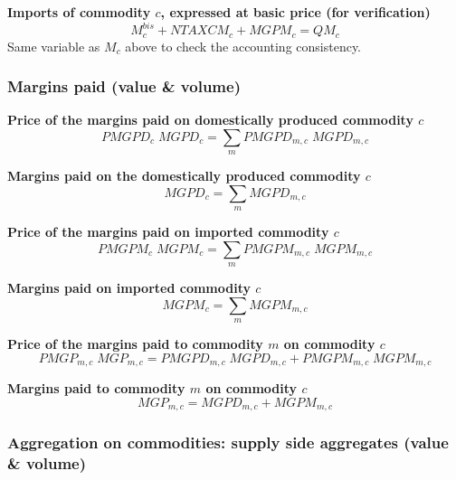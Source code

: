 \documentclass[12pt]{article}
\numberwithin{equation}{section}
\begin{document}
\noindent \textbf{Imports of commodity $c$, expressed at basic price (for verification)} 
\begin{dmath}
M^{bis}_{c} + NTAXCM_{c} + MGPM_{c} = QM_{c}
\label{SU.mdlMbis[c]}
\end{dmath}
Same variable as $M_{c}$ above to check the accounting consistency. \\



\subsubsection{Margins paid (value \& volume)}


\noindent \textbf{Price of the margins paid on domestically produced commodity $c$} 
\begin{dmath}
PMGPD_{c} \; MGPD_{c} = \sum_{m} PMGPD_{m, c} \; MGPD_{m, c}
\label{SU.mdlPMGPD[c]}
\end{dmath}

\noindent \textbf{Margins paid on the domestically produced commodity $c$} 
\begin{dmath}
MGPD_{c} = \sum_{m} MGPD_{m, c}
\label{SU.mdlMGPD[c]}
\end{dmath}

\noindent \textbf{Price of the margins paid on imported commodity $c$} 
\begin{dmath}
PMGPM_{c} \; MGPM_{c} = \sum_{m} PMGPM_{m, c} \; MGPM_{m, c}
\label{SU.mdlPMGPM[c]}
\end{dmath}

\noindent \textbf{Margins paid on imported commodity $c$} 
\begin{dmath}
MGPM_{c} = \sum_{m} MGPM_{m, c}
\label{SU.mdlMGPM[c]}
\end{dmath}

\noindent \textbf{Price of the margins paid to commodity $m$ on commodity $c$} 
\begin{dmath}
PMGP_{m, c} \; MGP_{m, c} = PMGPD_{m, c} \; MGPD_{m, c} + PMGPM_{m, c} \; MGPM_{m, c}
\label{SU.mdlPMGP[m, c]}
\end{dmath}

\noindent \textbf{Margins paid to commodity $m$ on commodity $c$} 
\begin{dmath}
MGP_{m, c} = MGPD_{m, c} + MGPM_{m, c}
\label{SU.mdlMGP[m, c]}
\end{dmath}




\subsubsection{Aggregation on commodities: supply side aggregates (value \& volume)}
\end{document}

